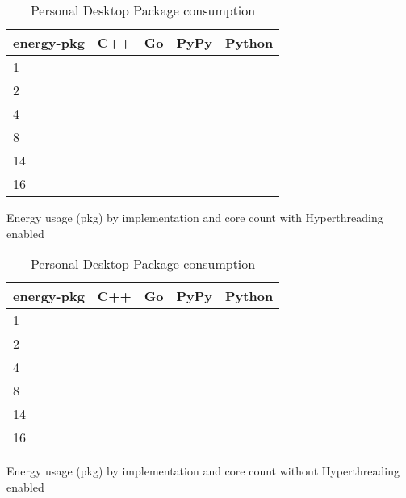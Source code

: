 \begin{table}[H]
    \centering
    \begin{tabular}{lrrrr}
        \hline
        energy-pkg     & C++                 & Go          & PyPy       & Python              \\
        \hline
        1              &                     &             &            &                    \\
        2              &                     &             &            &                    \\
        4              &                     &             &            &                    \\
        8	           &                     &             &            &                    \\
        14             &                     &             &            &                    \\
        16             &                     &             &            &                    \\
        \hline
    \end{tabular}
\caption{Personal Desktop Package consumption}{Energy usage (pkg) by implementation and core count with Hyperthreading enabled}
\label{tab:desktop-energy-pkg-hyperthreading}
\end{table}

\begin{table}[H]
    \centering
    \begin{tabular}{lrrrr}
        \hline
        energy-pkg     & C++                 & Go          & PyPy       & Python              \\
        \hline
        1              &                     &             &            &                    \\
        2              &                     &             &            &                    \\
        4              &                     &             &            &                    \\
        8	           &                     &             &            &                    \\
        14             &                     &             &            &                    \\
        16             &                     &             &            &                    \\
        \hline
    \end{tabular}
\caption{Personal Desktop Package consumption}{Energy usage (pkg) by implementation and core count without Hyperthreading enabled}
\label{tab:desktop-energy-pkg}
\end{table}

